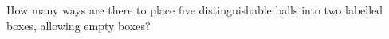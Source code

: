 How many ways are there to place five distinguishable balls into two labelled boxes, allowing empty boxes?
